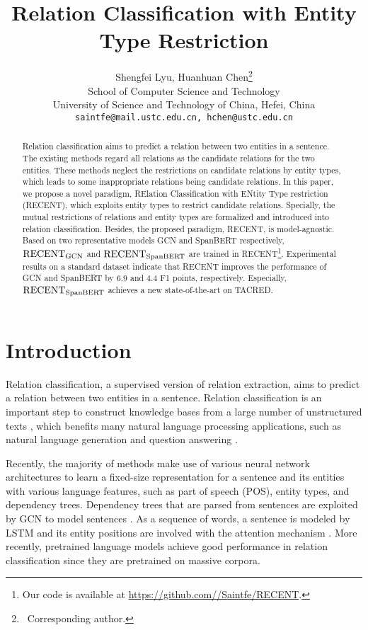 \documentclass[11pt,a4paper]{article}
\title{Relation Classification with Entity Type Restriction}
\author{Shengfei Lyu, \quad Huanhuan Chen\thanks{\, Corresponding author.} \\
  School of Computer Science and Technology \\
  University of Science and Technology of China, Hefei, China  \\
  \texttt{saintfe@mail.ustc.edu.cn, hchen@ustc.edu.cn} }
\date{}
\begin{document}
\maketitle

\begin{abstract}
Relation classification aims to predict a relation between two entities in a sentence. 
The existing methods regard all relations as the candidate relations for the two entities. 
These methods  neglect the restrictions on candidate relations by entity types, 
which leads to some inappropriate relations 
being candidate relations. 
In this paper, we propose a novel paradigm,  RElation Classification with ENtity Type restriction (RECENT), 
which exploits entity types to restrict candidate relations. 
Specially, the mutual restrictions of relations and entity types are formalized and 
introduced into relation classification. Besides, the proposed paradigm, RECENT, 
is model-agnostic. 
Based on two representative models GCN and SpanBERT respectively, 
$\text{RECENT}_{\rm GCN}$ and $\text{RECENT}_{\rm SpanBERT}$ 
 are trained in RECENT\footnote{Our code is available at \url{https://github.com//Saintfe/RECENT}.}.
Experimental results on a standard dataset indicate that 
RECENT improves the performance of GCN and SpanBERT by 6.9 and 4.4 F1 points, respectively. 
Especially, $\text{RECENT}_{\rm SpanBERT}$ achieves a new state-of-the-art on TACRED.

\end{abstract}


\section{Introduction}


Relation classification, a supervised version of relation extraction, aims to predict a relation between two entities in a sentence. 
Relation classification is an important step to construct knowledge bases from a large number of unstructured texts \cite{trisedya-etal-2019-neural}, 
which benefits many natural language processing applications, 
such as natural language generation \cite{kang-hashimoto-2020-improved} and question answering \cite{zhao-2020-conditiion}.

Recently, the majority of methods make use of various neural network architectures to learn a fixed-size representation for a sentence and its entities  
with various language features, such as part of speech (POS), entity types, and dependency trees. 
Dependency trees that are parsed from sentences are exploited by GCN \cite{kipf-2017-gcn} to  model sentences \cite{zhang-etal-2018-graph, guo-etal-2019-attention}. 
As a sequence of words, a sentence is modeled by LSTM \cite{hochreiter1997long} and its entity positions are involved with the attention mechanism \cite{zhang-etal-2017-position}.
More recently, pretrained language models \cite{devlin-etal-2019-bert,baldini-soares-etal-2019-matching,joshi-etal-2020-spanbert} 
achieve good performance in relation classification since they are pretrained on massive corpora.
\end{document}
